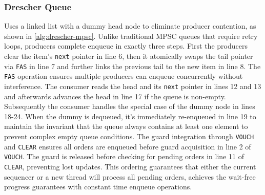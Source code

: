 \subsubsection{Drescher Queue}
Uses a linked list with a dummy head node to eliminate producer contention, as shown in \cref{alg:drescher-mpsc}. Unlike traditional \ac{MPSC} queues that require retry loops, producers complete enqueue in exactly three steps. First the producers clear the item's \texttt{next} pointer in line 6, then it atomically swaps the tail pointer via \texttt{\ac{FAS}} in line 7 and further links the previous tail to the new item in line 8. The \texttt{\ac{FAS}} operation ensures multiple producers can enqueue concurrently without interference. The consumer reads the head and its \texttt{next} pointer in lines 12 and 13 and afterwards advances the head in line 17 if the queue is non-empty. Subsequently the consumer handles the special case of the dummy node in lines 18-24. When the dummy is dequeued, it's immediately re-enqueued in line 19 to maintain the invariant that the queue always contains at least one element to prevent complex empty queue conditions. The guard integration through \texttt{VOUCH} and \texttt{CLEAR} ensures all orders are enqueued before guard acquisition in line 2 of \texttt{VOUCH}. The guard is released before checking for pending orders in line 11 of \texttt{CLEAR}, preventing lost updates. This ordering guarantees that either the current sequencer or a new thread will process all pending orders, achieves the wait-free progress guarantees with constant time enqueue operations. \cite{Drescher2015GuardedSections}

